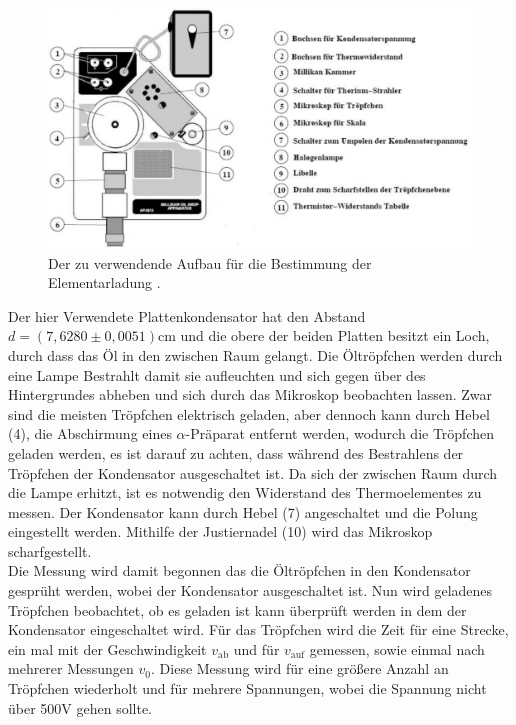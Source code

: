 \begin{figure}[h!]
\centering
\includegraphics[scale=0.6]{Grafiken/Aufbau.pdf}
\caption{Der zu verwendende Aufbau für die Bestimmung der Elementarladung \cite{V503}.}
\label{Aufbau}
\end{figure}
Der hier Verwendete Plattenkondensator hat den Abstand $d=(7,6280\pm0,0051)$cm und die obere der beiden Platten besitzt ein Loch, durch dass das Öl in den zwischen Raum gelangt. Die Öltröpfchen werden durch eine Lampe Bestrahlt damit sie aufleuchten und sich gegen über des Hintergrundes abheben und sich durch das Mikroskop beobachten lassen. Zwar sind die meisten Tröpfchen elektrisch geladen, aber dennoch kann durch Hebel (4), die Abschirmung eines $\alpha$-Präparat entfernt werden, wodurch die Tröpfchen geladen werden, es ist darauf zu achten, dass während des Bestrahlens der Tröpfchen der Kondensator ausgeschaltet ist. Da sich der zwischen Raum durch die Lampe erhitzt, ist es notwendig den Widerstand des Thermoelementes zu messen. Der Kondensator kann durch Hebel (7) angeschaltet und die Polung eingestellt werden. Mithilfe der Justiernadel (10) wird das Mikroskop scharfgestellt.\\
Die Messung wird damit begonnen das die Öltröpfchen in den Kondensator gesprüht werden, wobei der Kondensator ausgeschaltet ist. Nun wird geladenes Tröpfchen beobachtet, ob es geladen ist kann überprüft werden in dem der Kondensator eingeschaltet wird. Für das Tröpfchen wird die Zeit für eine Strecke, ein mal mit der Geschwindigkeit $v_\text{ab}$ und für $v_\text{auf}$ gemessen, sowie einmal nach mehrerer Messungen $v_0$. Diese Messung wird für eine größere Anzahl an Tröpfchen wiederholt und für mehrere Spannungen, wobei die Spannung nicht über 500V  gehen sollte.

